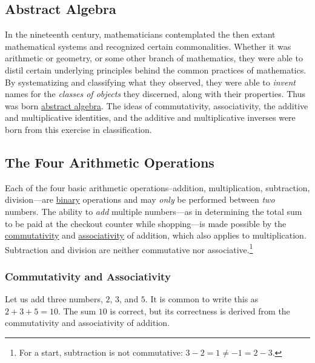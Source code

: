 \documentclass[
  a4paper,
]{article}
\begin{document}
\hypertarget{abstract-algebra}{%
\subsection{Abstract Algebra}\label{abstract-algebra}}

In the nineteenth century, mathematicians contemplated the then extant
mathematical systems and recognized certain commonalities. Whether it
was arithmetic or geometry, or some other branch of mathematics, they
were able to distil certain underlying principles behind the common
practices of mathematics. By systematizing and classifying what they
observed, they were able to \emph{invent} names for the \emph{classes of
objects} they discerned, along with their properties. Thus was born
\href{https://en.wikipedia.org/wiki/Abstract_algebra}{abstract algebra}.
The ideas of commutativity, associativity, the additive and
multiplicative identities, and the additive and multiplicative inverses
were born from this exercise in classification.

\hypertarget{the-four-arithmetic-operations}{%
\subsection{The Four Arithmetic
Operations}\label{the-four-arithmetic-operations}}

Each of the four basic arithmetic operations--addition, multiplication,
subtraction, division---are
\href{https://en.wikipedia.org/w/index.php?title=Binary_operation\&oldid=1182322931}{binary}
operations and may \emph{only} be performed between \emph{two} numbers.
The ability to \emph{add} multiple numbers---as in determining the total
sum to be paid at the checkout counter while shopping---is made possible
by the
\href{https://en.wikipedia.org/wiki/Commutative_property}{commutativity}
and
\href{https://en.wikipedia.org/wiki/Associative_property}{associativity}
of addition, which also applies to multiplication. Subtraction and
division are neither commutative nor associative.\footnote{For a start,
  subtraction is not commutative: \(3 - 2 = 1 \ne -1 = 2 - 3\).}

\hypertarget{commutativity-and-associativity}{%
\subsubsection{Commutativity and
Associativity}\label{commutativity-and-associativity}}

Let us add three numbers, \(2\), \(3\), and \(5\). It is common to write
this as \(2 + 3 + 5 = 10\). The sum \(10\) is correct, but its
correctness is derived from the commutativity and associativity of
addition.
\end{document}
